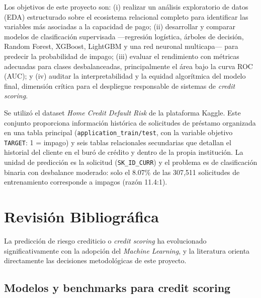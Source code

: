 \documentclass[journal]{IEEEtran}
\begin{document}
Los objetivos de este proyecto son: (i) realizar un análisis exploratorio de datos (EDA) estructurado sobre el ecosistema relacional completo para identificar las variables más asociadas a la capacidad de pago; (ii) desarrollar y comparar modelos de clasificación supervisada ---regresión logística, árboles de decisión, Random Forest, XGBoost, LightGBM y una red neuronal multicapa--- para predecir la probabilidad de impago; (iii) evaluar el rendimiento con métricas adecuadas para clases desbalanceadas, principalmente el área bajo la curva ROC (AUC); y (iv) auditar la interpretabilidad y la equidad algorítmica del modelo final, dimensión crítica para el despliegue responsable de sistemas de \textit{credit scoring}.

Se utilizó el dataset \textit{Home Credit Default Risk} de la plataforma Kaggle. Este conjunto proporciona información histórica de solicitudes de préstamo organizada en una tabla principal (\texttt{application\_train/test}, con la variable objetivo \texttt{TARGET}: 1 = impago) y seis tablas relacionales secundarias que detallan el historial del cliente en el buró de crédito y dentro de la propia institución. La unidad de predicción es la solicitud (\texttt{SK\_ID\_CURR}) y el problema es de clasificación binaria con desbalance moderado: solo el 8.07\% de las 307{,}511 solicitudes de entrenamiento corresponde a impagos (razón 11.4:1).

\section{Revisión Bibliográfica}

La predicción de riesgo crediticio o \textit{credit scoring} ha evolucionado significativamente con la adopción del \textit{Machine Learning}, y la literatura orienta directamente las decisiones metodológicas de este proyecto.

\subsection{Modelos y benchmarks para credit scoring}
\end{document}

